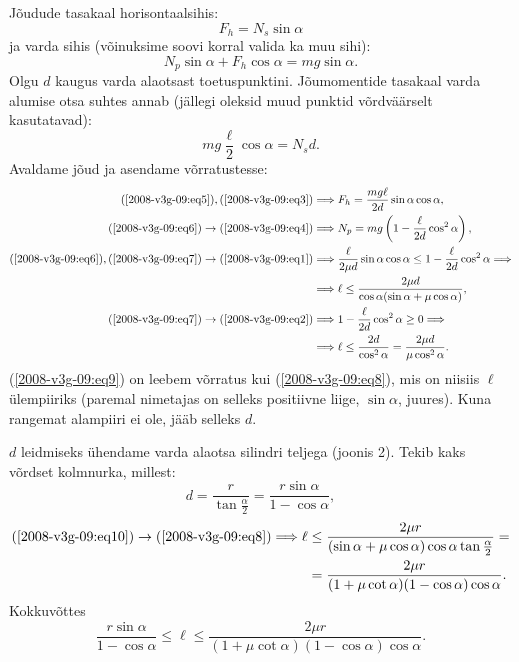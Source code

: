\documentclass[11pt]{article}
\begin{document}
{{Jõudude tasakaal horisontaalsihis:
\begin{equation} \label{2008-v3g-09:eq3}
F_h = N_s \sin \alpha
\end{equation}
ja varda sihis (võinuksime soovi korral valida ka muu sihi):
\begin{equation} \label{2008-v3g-09:eq4}
N_p \sin \alpha + F_h \cos \alpha = mg \sin \alpha.
\end{equation}
Olgu $d$ kaugus varda alaotsast toetuspunktini. Jõumomentide tasakaal varda alumise otsa suhtes annab (jällegi oleksid muud punktid võrdväärselt kasutatavad):
\begin{equation} \label{2008-v3g-09:eq5}
mg \frac{\ell}{2} \cos \alpha = N_sd.
\end{equation}
Avaldame jõud ja asendame võrratustesse:
\begin{align}
	(\ref{2008-v3g-09:eq5}),(\ref{2008-v3g-09:eq3}) & \Longrightarrow F_{h}=\frac{m g \ell}{2 d} \sin \alpha \cos \alpha, \label{2008-v3g-09:eq6}\\
	(\ref{2008-v3g-09:eq6}) \rightarrow(\ref{2008-v3g-09:eq4}) & \Longrightarrow N_{p}=m g\left(1-\frac{\ell}{2 d} \cos ^{2} \alpha\right),\label{2008-v3g-09:eq7} \\
	(\ref{2008-v3g-09:eq6}),(\ref{2008-v3g-09:eq7}) \rightarrow(\ref{2008-v3g-09:eq1}) & \Longrightarrow \frac{\ell}{2 \mu d} \sin \alpha \cos \alpha \leq 1-\frac{\ell}{2 d} \cos ^{2} \alpha \Longrightarrow\nonumber \\ 
	& \Longrightarrow \ell \leq \frac{2 \mu d}{\cos \alpha(\sin \alpha+\mu \cos \alpha)},\label{2008-v3g-09:eq8} \\
	(\ref{2008-v3g-09:eq7}) \rightarrow(\ref{2008-v3g-09:eq2}) & \Longrightarrow 1-\frac{\ell}{2 d} \cos ^{2} \alpha \geq 0 \Longrightarrow\nonumber \\ 
	& \Longrightarrow \ell \leq \frac{2 d}{\cos ^{2} \alpha}=\frac{2 \mu d}{\mu \cos ^{2} \alpha}. \label{2008-v3g-09:eq9}
\end{align}
(\ref{2008-v3g-09:eq9}) on leebem võrratus kui (\ref{2008-v3g-09:eq8}), mis on niisiis $\ell $ ülempiiriks (paremal nimetajas on selleks positiivne liige, $\sin \alpha$, juures). Kuna rangemat alampiiri ei ole, jääb selleks $d$.

$d$ leidmiseks ühendame varda alaotsa silindri teljega (joonis 2). Tekib kaks võrdset kolmnurka, millest:
\begin{equation}\label{2008-v3g-09:eq10}
d=\frac{r}{\tan \frac{\alpha}{2}}=\frac{r \sin \alpha}{1-\cos \alpha},
\end{equation}
\[
\begin{aligned}
(\ref{2008-v3g-09:eq10}) \rightarrow(\ref{2008-v3g-09:eq8}) \Longrightarrow \ell & \leq \frac{2 \mu r}{(\sin \alpha+\mu \cos \alpha) \cos \alpha \tan \frac{\alpha}{2}}=\\
&=\frac{2 \mu r}{(1+\mu \cot \alpha)(1-\cos \alpha) \cos \alpha} .
\end{aligned}
\]
Kokkuvõttes
\[
\frac{r \sin \alpha}{1-\cos \alpha} \leq \ell \leq \frac{2 \mu r}{(1+\mu \cot \alpha)(1-\cos \alpha) \cos \alpha}.
\]

}}
\end{document}
